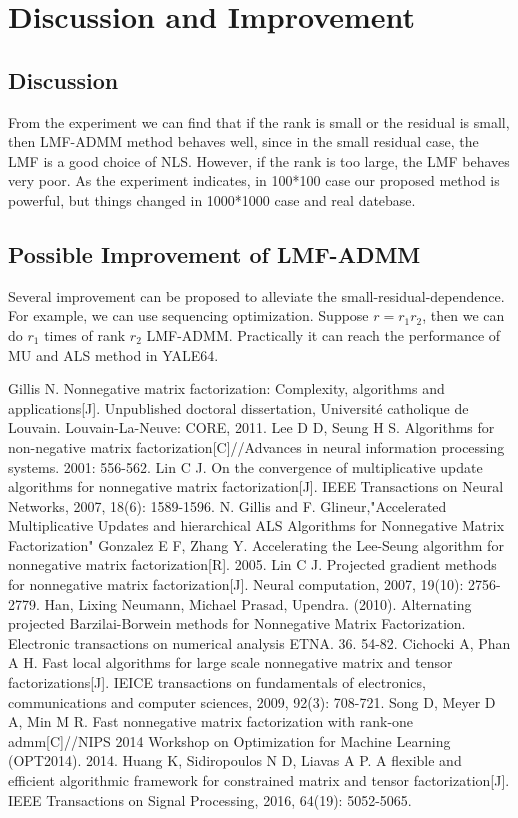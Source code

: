 \documentclass{article}
\begin{document}
\section{Discussion and Improvement}
\subsection{Discussion}
	From the experiment we can find that if the rank is small or the residual is small, then LMF-ADMM method behaves well, since in the small residual case, the LMF is a good choice of  NLS. However, if the rank is too large, the LMF behaves very poor. As the experiment indicates, in 100*100 case our proposed method is powerful, but things changed in 1000*1000 case and real datebase.
	
\subsection{Possible Improvement of LMF-ADMM}
	Several improvement can be proposed to alleviate the small-residual-dependence. For example, we can use sequencing optimization. Suppose $r = r_1r_2$, then we can do $r_1$ times of rank $r_2$ LMF-ADMM. Practically it can reach the performance of MU and ALS method in YALE64.
\begin{thebibliography}{99}  
	Gillis N. Nonnegative matrix factorization: Complexity, algorithms and applications[J]. Unpublished doctoral dissertation, Université catholique de Louvain. Louvain-La-Neuve: CORE, 2011.
	Lee D D, Seung H S. Algorithms for non-negative matrix factorization[C]//Advances in neural information processing systems. 2001: 556-562.
	Lin C J. On the convergence of multiplicative update algorithms for nonnegative matrix factorization[J]. IEEE Transactions on Neural Networks, 2007, 18(6): 1589-1596.
	N. Gillis and F. Glineur,"Accelerated Multiplicative Updates and hierarchical ALS Algorithms for Nonnegative Matrix Factorization"
	Gonzalez E F, Zhang Y. Accelerating the Lee-Seung algorithm for nonnegative matrix factorization[R]. 2005.
	Lin C J. Projected gradient methods for nonnegative matrix factorization[J]. Neural computation, 2007, 19(10): 2756-2779.
	Han, Lixing  Neumann, Michael Prasad, Upendra. (2010). Alternating projected Barzilai-Borwein methods for Nonnegative Matrix Factorization. Electronic transactions on numerical analysis ETNA. 36. 54-82. 
	Cichocki A, Phan A H. Fast local algorithms for large scale nonnegative matrix and tensor factorizations[J]. IEICE transactions on fundamentals of electronics, communications and computer sciences, 2009, 92(3): 708-721.
	Song D, Meyer D A, Min M R. Fast nonnegative matrix factorization with rank-one admm[C]//NIPS 2014 Workshop on Optimization for Machine Learning (OPT2014). 2014.
	Huang K, Sidiropoulos N D, Liavas A P. A flexible and efficient algorithmic framework for constrained matrix and tensor factorization[J]. IEEE Transactions on Signal Processing, 2016, 64(19): 5052-5065.
\end{thebibliography}
\end{document}
